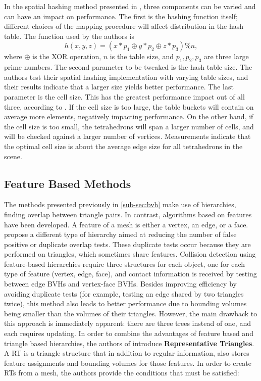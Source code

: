 
In the spatial hashing method presented in \citep{thm03}, three components can be varied and can have an impact on performance. The first is the hashing function itself; different choices of the mapping procedure will affect distribution in the hash table. The function used by the authors is \[h(x, y, z) = (x * p_{1} \oplus y * p_{2} \oplus  z * p_{3}) \% n,\] where $\oplus$ is the XOR operation, $n$ is the table size, and $p_{1}, p_{2}, p_{3}$ are three large prime numbers. The second parameter to be tweaked is the hash table size. The authors test their spatial hashing implementation with varying table sizes, and their results indicate that a larger size yields better performance. The last parameter is the cell size. This has the greatest performance impact out of all three, according to \citep{thm03}. If the cell size is too large, the table buckets will contain on average more elements, negatively impacting performance. On the other hand, if the cell size is too small, the tetrahedrons will span a larger number of cells, and will be checked against a larger number of vertices. Measurements indicate that the optimal cell size is about the average edge size for all tetrahedrons in the scene.


\FloatBarrier
\subsection{Feature Based Methods}
\label{sub-sec:feature}

The methods presented previously in \autoref{sub-sec:bvh} make use of hierarchies, finding overlap between triangle pairs. In contrast, algorithms based on features have been developed. A feature of a mesh is either a vertex, an edge, or a face. \citep{curtis2008} propose a different type of hierarchy aimed at reducing the number of false positive or duplicate overlap tests. These duplicate tests occur because they are performed on triangles, which sometimes share features. Collision detection using feature-based hierarchies require three structures for each object, one for each type of feature (vertex, edge, face), and contact information is received by testing between edge BVHs and vertex-face BVHs. Besides improving efficiency by avoiding duplicate tests (for example, testing an edge shared by two triangles twice), this method also leads to better performance due to bounding volumes being smaller than the volumes of their triangles. However, the main drawback to this approach is immediately apparent: there are three trees instead of one, and each requires updating. In order to combine the advantages of feature based and triangle based hierarchies, the authors of \citep{curtis2008} introduce \textbf{Representative Triangles}. A RT is a triangle structure that in addition to regular information, also stores feature assignments and bounding volumes for those features. In order to create RTs from a mesh, the authors provide the conditions that must be satisfied:

